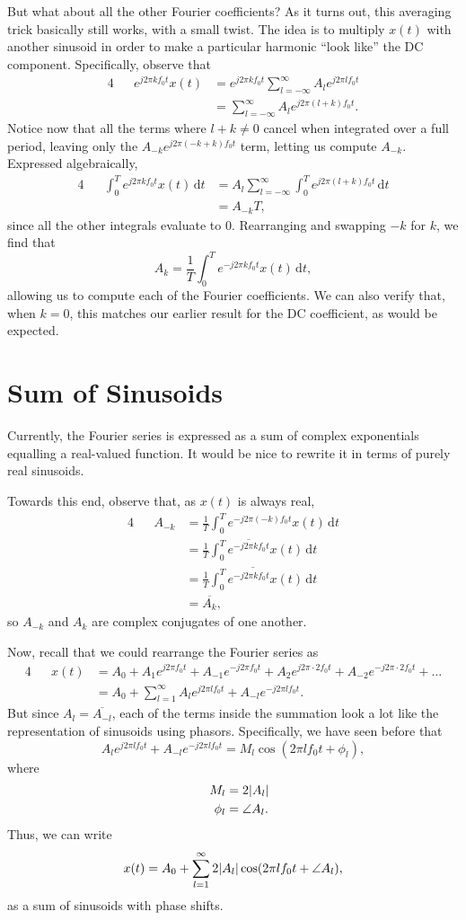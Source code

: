 \documentclass[letterpaper]{article}
\theoremstyle{remark}
\newcommand{\dt}{\mathrm{d}t}
\newcommand{\eqn}[1]{\begin{alignat*}{4}#1\end{alignat*}}
\begin{document}
But what about all the other Fourier coefficients? As it turns out, this averaging trick basically still works, with a small twist. The idea is to multiply $x(t)$ with another sinusoid in order to make a particular harmonic ``look like'' the DC component. Specifically, observe that
\eqn{
    && e^{j2\pi k f_0 t} x(t) &= e^{j2\pi k f_0 t} \sum_{l=-\infty}^\infty A_l e^{j2\pi l f_0 t} \\
    &&&= \sum_{l=-\infty}^\infty A_l e^{j2\pi (l + k) f_0 t}.
}
Notice now that all the terms where $l + k \ne 0$ cancel when integrated over a full period, leaving only the $A_{-k} e^{j 2\pi (-k + k) f_0 t}$ term, letting us compute $A_{-k}$. Expressed algebraically,
\eqn{
    && \int_0^T e^{j2\pi k f_0 t} x(t) \, \dt &= A_l \sum_{l=-\infty}^\infty \int_0^T e^{j2\pi (l + k) f_0 t} \, \dt \\
    &&&= A_{-k} T,
}
since all the other integrals evaluate to $0$. Rearranging and swapping $-k$ for $k$, we find that
\[
    A_k = \frac{1}{T} \int_0^T e^{-j2\pi k f_0 t} x(t) \, \dt,
\]
allowing us to compute each of the Fourier coefficients. We can also verify that, when $k=0$, this matches our earlier result for the DC coefficient, as would be expected.

\section{Sum of Sinusoids}
Currently, the Fourier series is expressed as a sum of complex exponentials equalling a real-valued function. It would be nice to rewrite it in terms of purely real sinusoids.

Towards this end, observe that, as $x(t)$ is always real,
\eqn{
    && A_{-k} &= \frac{1}{T} \int_0^T e^{-j2\pi (-k) f_0 t} x(t) \, \dt \\
    &&&= \frac{1}{T} \int_0^T \overline{e^{-j2\pi k f_0 t}} x(t) \, \dt \\
    &&&= \overline{\frac{1}{T} \int_0^T e^{-j2\pi k f_0 t} x(t)} \, \dt \\
    &&&= \overline{A_{k}},
}
so $A_{-k}$ and $A_k$ are complex conjugates of one another. 

Now, recall that we could rearrange the Fourier series as
\eqn{
    && x(t) &= A_0 + A_1 e^{j2\pi f_0 t} + A_{-1} e^{-j2\pi f_0 t} + A_2 e^{j2\pi \cdot 2 f_0 t} + A_{-2} e^{-j2\pi \cdot 2 f_0 t} + \ldots \\
    &&&= A_0 + \sum_{l=1}^\infty A_l e^{j2\pi l f_0 t} + A_{-l} e^{-j2\pi l f_0 t}.
}
But since $A_l = \overline{A_{-l}}$, each of the terms inside the summation look a lot like the representation of sinusoids using phasors. Specifically, we have seen before that
\[
    A_l e^{j2\pi l f_0 t} + A_{-l} e^{-j2\pi l f_0 t} = M_l \cos(2\pi l f_0 t + \phi_l), 
\]
where
\eqn{
    && M_l &= 2\abs{A_l} \\
    && \phi_l &= \angle A_l.
}
Thus, we can write
\[
    x(t) = A_0 + \sum_{l=1}^\infty 2\abs{A_l} \cos(2\pi lf_0 t + \angle A_l),
\]
as a sum of sinusoids with phase shifts.
\end{document}
